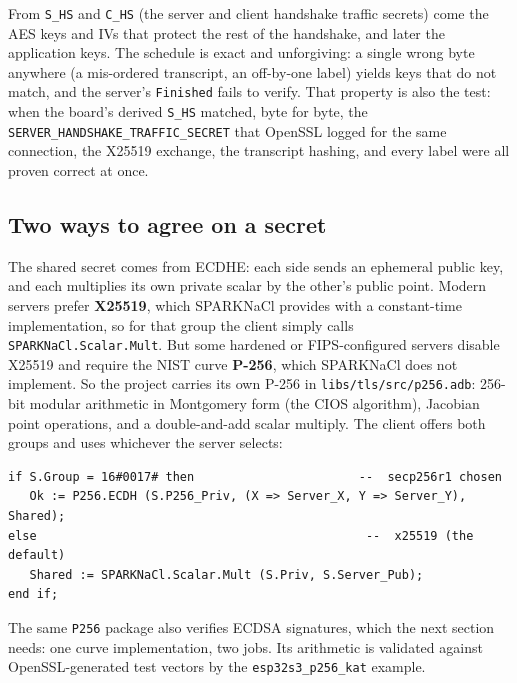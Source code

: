 From \texttt{S\_HS} and \texttt{C\_HS} (the server and client handshake traffic
secrets) come the AES keys and IVs that protect the rest of the handshake, and
later the application keys. The schedule is exact and unforgiving: a single wrong
byte anywhere (a mis-ordered transcript, an off-by-one label) yields keys that
do not match, and the server's \texttt{Finished} fails to verify. That property is
also the test: when the board's derived \texttt{S\_HS} matched, byte for byte, the
\texttt{SERVER\_HANDSHAKE\_TRAFFIC\_SECRET} that OpenSSL logged for the same
connection, the X25519 exchange, the transcript hashing, and every label were all
proven correct at once.

\subsection{Two ways to agree on a secret}
\label{ch:tls:ecdhe}

The shared secret comes from ECDHE: each side sends an ephemeral public key, and
each multiplies its own private scalar by the other's public point. Modern servers
prefer \textbf{X25519}, which SPARKNaCl provides with a constant-time
implementation, so for that group the client simply calls
\texttt{SPARKNaCl.Scalar.Mult}. But some hardened or FIPS-configured servers
disable X25519 and require the NIST curve \textbf{P-256}, which SPARKNaCl does not
implement. So the project carries its own P-256 in \texttt{libs/tls/src/p256.adb}:
256-bit modular arithmetic in Montgomery form (the CIOS algorithm), Jacobian point
operations, and a double-and-add scalar multiply. The client offers both groups
and uses whichever the server selects:

\begin{lstlisting}
if S.Group = 16#0017# then                       --  secp256r1 chosen
   Ok := P256.ECDH (S.P256_Priv, (X => Server_X, Y => Server_Y), Shared);
else                                              --  x25519 (the default)
   Shared := SPARKNaCl.Scalar.Mult (S.Priv, S.Server_Pub);
end if;
\end{lstlisting}

The same \texttt{P256} package also verifies ECDSA signatures, which the next
section needs: one curve implementation, two jobs. Its arithmetic is validated
against OpenSSL-generated test vectors by the \texttt{esp32s3\_p256\_kat} example.


